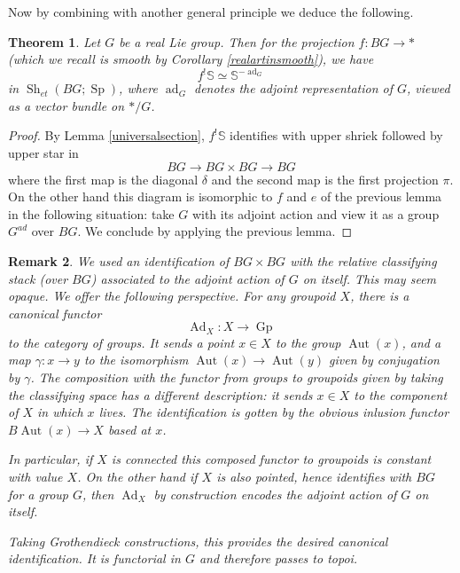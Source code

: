 \documentclass[12pt]{article}
\newtheorem{theorem}{Theorem}[section]
\newtheorem{remark}[theorem]{Remark}
\newcommand{\on}{\operatorname}
\newcommand{\mbb}{\mathbb}
\begin{document}
Now by combining with another general principle we deduce the following.

\begin{theorem}\label{realgrouplinearize}
Let $G$ be a real Lie group.  Then for the projection $f:BG \to \ast$ (which we recall is smooth by Corollary \ref{realartinsmooth}), we have
$$f^!\mbb{S} \simeq \mbb{S}^{-\on{ad}_G}$$
in $\on{Sh}_{et}(BG;\on{Sp})$, where $\on{ad}_G$ denotes the adjoint representation of $G$, viewed as a vector bundle on $\ast/G$.
\end{theorem}
\begin{proof}
By Lemma \ref{universalsection}, $f^!\mbb{S}$ identifies with upper shriek followed by upper star in
$$BG\to BG\times BG \to BG$$
where the first map is the diagonal $\delta$ and the second map is the first projection $\pi$.  On the other hand this diagram is isomorphic to $f$ and $e$ of the previous lemma in the following situation: take $G$ with its adjoint action and view it as a group $G^{ad}$ over $BG$.  We conclude by applying the previous lemma.
\end{proof}

\begin{remark}
We used an identification of $BG \times BG$ with the relative classifying stack (over $BG$) associated to the adjoint action of $G$ on itself.  This may seem opaque.  We offer the following perspective.  For any groupoid $X$, there is a canonical functor
$$\on{Ad}_X: X \to \on{Gp}$$
to the category of groups.  It sends a point $x\in X$ to the group $\on{Aut}(x)$, and a map $\gamma:x\to y$ to the isomorphism $\on{Aut}(x)\to \on{Aut}(y)$ given by conjugation by $\gamma$.  The composition with the functor from groups to groupoids given by taking the classifying space has a different description: it sends $x\in X$ to the component of $X$ in which $x$ lives.  The identification is gotten by the obvious inlusion functor $B\on{Aut}(x)\rightarrow X$ based at $x$.

In particular, if $X$ is connected this composed functor to groupoids is constant with value $X$.  On the other hand if $X$ is also pointed, hence identifies with $BG$ for a group $G$, then $\on{Ad}_X$ by construction encodes the adjoint action of $G$ on itself.

Taking Grothendieck constructions, this provides the desired canonical identification.  It is functorial in $G$ and therefore passes to topoi.
\end{remark}
\end{document}
